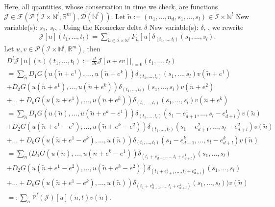 \documentclass[runningheads]{llncs}
\newcommand{\1}{\chi}
\begin{document}
Here, all quantities, whose conservation in time we check, are functions \(\mathcal{J}\in\mathcal{F}(\mathcal{P}(\mathcal{I}\times\mathbb{N}^l,\mathbb{R}^m),\mathcal{D}(\mathbb{N}^l))\). 
Let \(\tilde{n}:=(n_1,\dots,n_d,s_1,\dots,s_l)\in\mathcal{I}\times\mathbb{N}^l\)
{\color{blue} New variable(s): \(s_1\), \(s_l\),  }
. Using the Kronecker delta \(\delta\)
{\color{blue} New variable(s): \(\delta\),  }
, we rewrite
\begin{gather*}
	\mathcal{J}[u](t_1,\ldots,t_{l})
	=\sum_{\tilde{n}\in\mathcal{I}\times\mathbb{N}^l}F_{\tilde{n}}[u]\delta_{(t_1,\ldots,t_{l})}(s_1,\ldots,s_l).
\end{gather*}
Let \(u,v\in\mathcal{P}(\mathcal{I}\times\mathbb{N}^l,\mathbb{R}^m)\), then
\footnotesize
\begin{gather*}
	D^l\mathcal{J}[u](v)(t_1,\ldots,t_{l}):=\frac{d}{d\epsilon}\mathcal{J}[u+\epsilon v]\Big|_{\epsilon=0}(t_1,\ldots,t_{l})\\
	=\sum_{\tilde{n}}D_1G(u(\tilde{n}+e^1),\ldots,u(\tilde{n}+e^k))\delta_{(t_1,\ldots,t_{l})}(s_1,\ldots,s_l)v(\tilde{n}+e^1)\\
	+D_2G(u(\tilde{n}+e^1),\ldots,u(\tilde{n}+e^k))\delta_{(t_1,\ldots,t_{l})}(s_1,\ldots,s_l)v(\tilde{n}+e^2)\\+\ldots
	+D_kG(u(\tilde{n}+e^1),\ldots,u(\tilde{n}+e^k))\delta_{(t_1,\ldots,t_{l})}(s_1,\ldots,s_l)v(\tilde{n}+e^k)\\
	=\sum_{\tilde{n}}D_1G(u(\tilde{n}),\ldots,u(\tilde{n}+e^k-e^1))\delta_{(t_1,\ldots,t_{l})}(s_1-e^1_{d+1},\ldots,s_l-e^1_{d+l})v(\tilde{n})\\
	+D_2G(u(\tilde{n}+e^1-e^2),\ldots,u(\tilde{n}+e^k-e^2))\delta_{(t_1,\ldots,t_{l})}(s_1-e^2_{d+1},\ldots,s_l-e^2_{d+l})v(\tilde{n})\\+\ldots
	+D_kG(u(\tilde{n}+e^1-e^k),\ldots,u(\tilde{n}))\delta_{(t_1,\ldots,t_{l})}(s_1-e^k_{d+1},\ldots,s_l-e^k_{d+l})v(\tilde{n})\\
	=\sum_{\tilde{n}}\Big(D_1G(u(\tilde{n}),\ldots,u(\tilde{n}+e^k-e^1))\delta_{(t_1+e^1_{d+1},\ldots,t_{l}+e^1_{d+l})}(s_1,\ldots,s_l)\\
	+D_2G(u(\tilde{n}+e^1-e^2),\ldots,u(\tilde{n}+e^k-e^2))\delta_{(t_1+e^2_{d+1},\ldots,t_{l}+e^2_{d+l})}(s_1,\ldots,s_l)\\+\ldots
	+D_kG(u(\tilde{n}+e^1-e^k),\ldots,u(\tilde{n}))\delta_{(t_1+e^k_{d+1},\ldots,t_{l}+e^k_{d+l})}(s_1,\ldots,s_l)\Big)v(\tilde{n})\\
	=:\sum_{\tilde{n}}\mathcal{V}^l(\mathcal{J})[u](\tilde{n},t)v(\tilde{n}).
\end{gather*}
\end{document}
